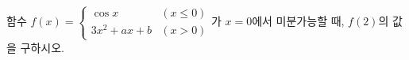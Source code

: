 함수 $f(x)=\begin{cases} \cos x & (x\le 0) \\ 3x^2+ax+b & (x>0) \end{cases}$가 $x=0$에서 미분가능할 때, $f(2)$의 값을 구하시오. 
